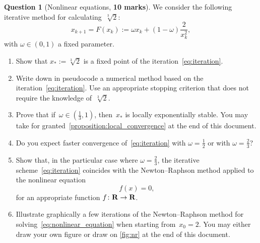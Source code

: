 \documentclass[11pt]{article}
\theoremstyle{definition}
\newtheorem{question}{Question}
\theoremstyle{remark}
\theoremstyle{plain}%
\begin{document}
\newpage
\begin{question}
    [Nonlinear equations, \textbf{10 marks}]
    We consider the following iterative method for calculating~$\sqrt[3]{2}$:
    \begin{equation}
        \label{eq:iteration}
        x_{k+1} = F(x_k) :=  \omega x_k + (1 - \omega) \frac{2}{x_k^2},
    \end{equation}
    with $\omega \in (0, 1)$ a fixed parameter.
    \begin{enumerate}
        \item
            \mymark
            Show that $x_* := \sqrt[3]{2}$ is a fixed point of the iteration~\eqref{eq:iteration}.

        \item
            Write down in pseudocode a numerical method based on the iteration~\eqref{eq:iteration}.
            Use an appropriate stopping criterion that does not require the knowledge of~$\sqrt[3]{2}$.

        \item
            Prove that if~$\omega \in \left(\frac{1}{3}, 1\right)$,
            then~$x_*$ is locally exponentially stable.
            You may take for granted~\cref{proposition:local_convergence} at the end of this document.

        \item
            \mymark
            Do you expect faster convergence of~\eqref{eq:iteration} with $\omega = \frac{1}{2}$ or with $\omega = \frac{2}{3}$?

        \item
            Show that, in the particular case where $\omega = \frac{2}{3}$,
            the iterative scheme~\eqref{eq:iteration} coincides with the Newton--Raphson method applied to
            the nonlinear equation
            \begin{equation}
                \label{eq:nonlinear_equation}
                f(x) = 0,
            \end{equation}
            for an appropriate function $f \colon \mathbf R \to \mathbf R$.

        \item
            Illustrate graphically a few iterations of the Newton--Raphson method for solving~\eqref{eq:nonlinear_equation} when starting from~$x_0 = 2$.
            You may either draw your own figure or draw on \cref{fig:nr} at the end of this document.


\end{enumerate}
\end{question}
\end{document}
